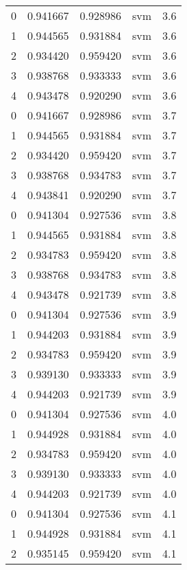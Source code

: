 \begin{tabular}{rrrlr}
     0 & 0.941667 & 0.928986 &      svm &        3.6 \\
     1 & 0.944565 & 0.931884 &      svm &        3.6 \\
     2 & 0.934420 & 0.959420 &      svm &        3.6 \\
     3 & 0.938768 & 0.933333 &      svm &        3.6 \\
     4 & 0.943478 & 0.920290 &      svm &        3.6 \\
     0 & 0.941667 & 0.928986 &      svm &        3.7 \\
     1 & 0.944565 & 0.931884 &      svm &        3.7 \\
     2 & 0.934420 & 0.959420 &      svm &        3.7 \\
     3 & 0.938768 & 0.934783 &      svm &        3.7 \\
     4 & 0.943841 & 0.920290 &      svm &        3.7 \\
     0 & 0.941304 & 0.927536 &      svm &        3.8 \\
     1 & 0.944565 & 0.931884 &      svm &        3.8 \\
     2 & 0.934783 & 0.959420 &      svm &        3.8 \\
     3 & 0.938768 & 0.934783 &      svm &        3.8 \\
     4 & 0.943478 & 0.921739 &      svm &        3.8 \\
     0 & 0.941304 & 0.927536 &      svm &        3.9 \\
     1 & 0.944203 & 0.931884 &      svm &        3.9 \\
     2 & 0.934783 & 0.959420 &      svm &        3.9 \\
     3 & 0.939130 & 0.933333 &      svm &        3.9 \\
     4 & 0.944203 & 0.921739 &      svm &        3.9 \\
     0 & 0.941304 & 0.927536 &      svm &        4.0 \\
     1 & 0.944928 & 0.931884 &      svm &        4.0 \\
     2 & 0.934783 & 0.959420 &      svm &        4.0 \\
     3 & 0.939130 & 0.933333 &      svm &        4.0 \\
     4 & 0.944203 & 0.921739 &      svm &        4.0 \\
     0 & 0.941304 & 0.927536 &      svm &        4.1 \\
     1 & 0.944928 & 0.931884 &      svm &        4.1 \\
     2 & 0.935145 & 0.959420 &      svm &        4.1 \\

\end{tabular}
